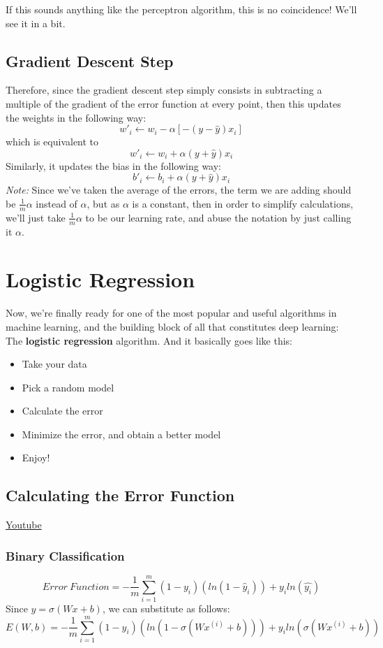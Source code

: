 If this sounds anything like the perceptron algorithm, this is no coincidence! We'll see it in a bit.
\subsection{Gradient Descent Step}

Therefore, since the gradient descent step simply consists in subtracting a multiple of the gradient of the error function at every point, then this updates the weights in the following way: \[w'_i \leftarrow w_i - \alpha[-(y-\hat{y})x_i]\]
which is equivalent to \[w'_i \leftarrow w_i + \alpha(y+\hat{y})x_i\]
Similarly, it updates the bias in the following way: \[b'_i \leftarrow b_i + \alpha(y+\hat{y})x_i\]
\textit{Note:} Since we've taken the average of the errors, the term we are adding should be \(\frac{1}{m} \alpha\) instead of \(\alpha\), but as \(\alpha\) is a constant, then in order to simplify calculations, we'll just take \(\frac{1}{m}\alpha\) to be our learning rate, and abuse the notation by just calling it \(\alpha\).

\section{Logistic Regression}

Now, we're finally ready for one of the most popular and useful algorithms in machine learning, and the building block of all that constitutes deep learning: The \textbf{logistic regression} algorithm. And it basically goes like this:

\begin{itemize}
    \item Take your data
    \item Pick a random model
    \item Calculate the error
    \item Minimize the error, and obtain a better model
    \item Enjoy!
\end{itemize}

\subsection{Calculating the Error Function}
\href{https://www.youtube.com/watch?v=V5kkHldUlVU&t=2s&ab_channel=Udacity}{Youtube} \newline

\subsubsection{Binary Classification}
\[Error\ Function = - \frac{1}{m} \sum_{i=1}^m (1-y_i)(ln(1-\hat{y}_i)) + y_iln(\hat{y_i})\]
Since \(\hat{y} = \sigma(Wx+b)\), we can substitute as follows: \[E(W,b) = - \frac{1}{m} \sum_{i=1}^m (1-y_i)(ln(1-\sigma(Wx^{(i)}+b))) + y_iln(\sigma(Wx^{(i)}+b))\]

